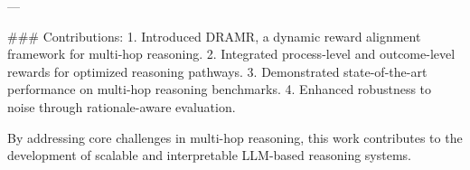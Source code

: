 ---

### Contributions:
1. Introduced DRAMR, a dynamic reward alignment framework for multi-hop reasoning.
2. Integrated process-level and outcome-level rewards for optimized reasoning pathways.
3. Demonstrated state-of-the-art performance on multi-hop reasoning benchmarks.
4. Enhanced robustness to noise through rationale-aware evaluation.

By addressing core challenges in multi-hop reasoning, this work contributes to the development of scalable and interpretable LLM-based reasoning systems.